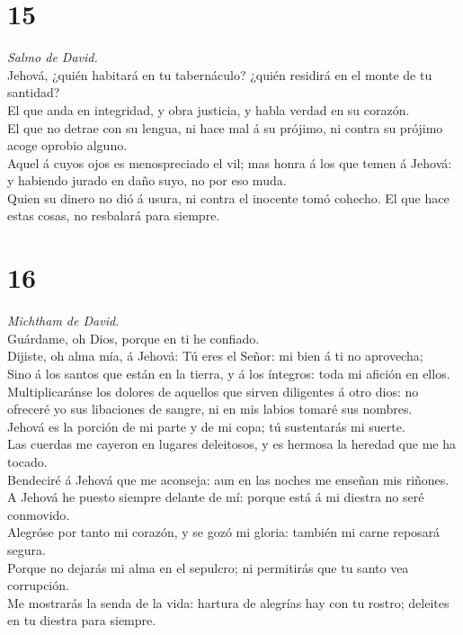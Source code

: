 \hypertarget{section-14}{%
\section{15}\label{section-14}}

 \emph{Salmo de David.}\\
Jehová, ¿quién habitará en tu tabernáculo? ¿quién residirá en el monte
de tu santidad?\\
 El que anda en integridad, y obra justicia, y habla verdad
en su corazón.\\
 El que no detrae con su lengua, ni hace mal á su prójimo,
ni contra su prójimo acoge oprobio alguno.\\
 Aquel á cuyos ojos es menospreciado el vil; mas honra á los
que temen á Jehová: y habiendo jurado en daño suyo, no por eso muda.\\
 Quien su dinero no dió á usura, ni contra el inocente tomó
cohecho. El que hace estas cosas, no resbalará para siempre.

\hypertarget{section-15}{%
\section{16}\label{section-15}}

 \emph{Michtham de David.}\\
Guárdame, oh Dios, porque en ti he confiado.\\
 Dijiste, oh alma mía, á Jehová: Tú eres el Señor: mi bien á
ti no aprovecha;\\
 Sino á los santos que están en la tierra, y á los íntegros:
toda mi afición en ellos.\\
 Multiplicaránse los dolores de aquellos que sirven
diligentes á otro dios: no ofreceré yo sus libaciones de sangre, ni en
mis labios tomaré sus nombres.\\
 Jehová es la porción de mi parte y de mi copa; tú
sustentarás mi suerte.\\
 Las cuerdas me cayeron en lugares deleitosos, y es hermosa
la heredad que me ha tocado.\\
 Bendeciré á Jehová que me aconseja: aun en las noches me
enseñan mis riñones.\\
 A Jehová he puesto siempre delante de mí: porque está á mi
diestra no seré conmovido.\\
 Alegróse por tanto mi corazón, y se gozó mi gloria: también
mi carne reposará segura.\\
 Porque no dejarás mi alma en el sepulcro; ni permitirás
que tu santo vea corrupción.\\
 Me mostrarás la senda de la vida: hartura de alegrías hay
con tu rostro; deleites en tu diestra para siempre.

